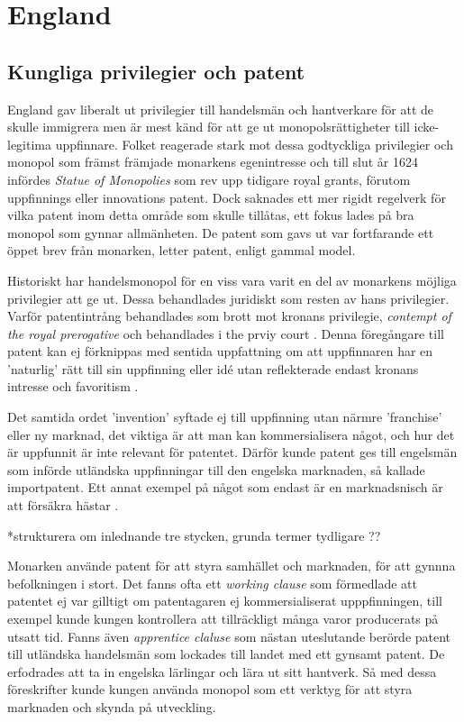 \section{England} 

\subsection{Kungliga privilegier och patent} 

England gav liberalt ut privilegier till handelsmän och hantverkare för att de skulle immigrera men är
mest känd för att ge ut monopolsrättigheter till icke-legitima uppfinnare. Folket reagerade stark mot
dessa godtyckliga privilegier och monopol som främst främjade monarkens egenintresse och till slut år 1624 infördes
\emph{Statue of Monopolies} som rev upp tidigare royal grants, förutom uppfinnings eller innovations patent.
Dock saknades ett mer rigidt regelverk för vilka patent inom detta område som skulle tillåtas, ett fokus
lades på bra monopol som gynnar allmänheten. De patent som gavs ut var fortfarande ett öppet brev från
monarken, letter patent, enligt gammal model.

Historiskt har handelsmonopol för en viss vara 
varit en del av monarkens möjliga privilegier att ge ut. Dessa behandlades
juridiskt som resten av hans privilegier. Varför patentintrång
behandlades som brott mot kronans privilegie, \emph{contempt of the royal prerogative} och behandlades i the prviy court \cite{macleod}. Denna
föregångare till patent kan ej förknippas med sentida uppfattning om att uppfinnaren har en 'naturlig' rätt till sin uppfinning eller idé
utan reflekterade endast kronans intresse och favoritism \cite{bracha}.

Det samtida ordet 'invention' syftade ej till uppfinning utan närmre 'franchise' eller ny marknad, det
viktiga är att man kan kommersialisera något, och hur det är uppfunnit är inte relevant för patentet\cite{bracha}.
Därför kunde patent ges till engelsmän som införde utländska uppfinningar till den engelska marknaden, så kallade importpatent.
Ett annat exempel på något som endast är en marknadsnisch är att försäkra hästar \cite{davies}.


*strukturera om inlednande tre stycken, grunda termer tydligare ??

Monarken använde patent för att styra samhället och marknaden, för att gynnna befolkningen i stort. Det fanns ofta ett \emph{working clause} som förmedlade att patentet ej var
gilltigt om patentagaren ej kommersialiserat upppfinningen, till exempel kunde kungen kontrollera att
tillräckligt många varor producerats på utsatt tid. Fanns även \emph{apprentice claluse} som nästan
uteslutande berörde patent till utländska handelsmän som lockades till landet med ett gynsamt patent. De erfodrades att ta in engelska lärlingar och
lära ut sitt hantverk. Så med dessa föreskrifter kunde kungen använda monopol som ett verktyg för att styra marknaden och skynda på utveckling.\cite{bracha}

